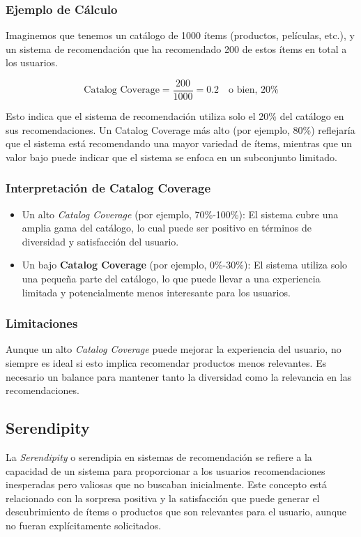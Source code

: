 \documentclass[11pt,a4paper,twoside]{thesis}
\begin{document}
\subsubsection{Ejemplo de Cálculo}

Imaginemos que tenemos un catálogo de 1000 ítems (productos, películas, etc.), y un sistema de recomendación que ha recomendado 200 de estos ítems en total a los usuarios.

\[
	\text{Catalog Coverage} = \frac{200}{1000} = 0.2 \quad \text{o bien, } 20\%
\]

Esto indica que el sistema de recomendación utiliza solo el 20\% del catálogo en sus recomendaciones. Un Catalog Coverage más alto (por ejemplo, 80\%) reflejaría que el sistema está recomendando una mayor variedad de ítems, mientras que un valor bajo puede indicar que el sistema se enfoca en un subconjunto limitado.

\subsubsection{Interpretación de Catalog Coverage}

\begin{itemize}
	\item Un alto \textit{Catalog Coverage} (por ejemplo, 70\%-100\%): El sistema cubre una amplia gama del catálogo, lo cual puede ser positivo en términos de diversidad y satisfacción del usuario.
	\item Un bajo \textbf{Catalog Coverage} (por ejemplo, 0\%-30\%): El sistema utiliza solo una pequeña parte del catálogo, lo que puede llevar a una experiencia limitada y potencialmente menos interesante para los usuarios.
\end{itemize}

\subsubsection{Limitaciones}

Aunque un alto \textit{Catalog Coverage} puede mejorar la experiencia del usuario, no siempre es ideal si esto implica recomendar productos menos relevantes. Es necesario un balance para mantener tanto la diversidad como la relevancia en las recomendaciones.


\subsection{Serendipity}

La \textit{Serendipity} o serendipia en sistemas de recomendación se refiere a la capacidad de un sistema para proporcionar a los usuarios recomendaciones inesperadas pero valiosas que no buscaban inicialmente. Este concepto está relacionado con la sorpresa positiva y la satisfacción que puede generar el descubrimiento de ítems o productos que son relevantes para el usuario, aunque no fueran explícitamente solicitados.
\end{document}
